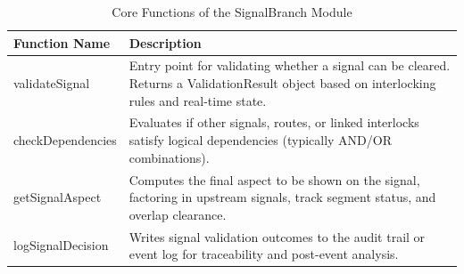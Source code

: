 \begin{table}[H]
    \centering
    \renewcommand{\arraystretch}{1.3}
    \caption{Core Functions of the SignalBranch Module}
    \begin{tabular}{p{5.2cm} p{10.2cm}}
        \toprule
        \textbf{Function Name} & \textbf{Description} \\
        \midrule
        validateSignal & Entry point for validating whether a signal can be cleared. Returns a ValidationResult object based on interlocking rules and real-time state. \\
        checkDependencies & Evaluates if other signals, routes, or linked interlocks satisfy logical dependencies (typically AND/OR combinations). \\
        getSignalAspect & Computes the final aspect to be shown on the signal, factoring in upstream signals, track segment status, and overlap clearance. \\
        logSignalDecision & Writes signal validation outcomes to the audit trail or event log for traceability and post-event analysis. \\
        \bottomrule
    \end{tabular}
    \label{tab:signal-branch-functions}
\end{table}
